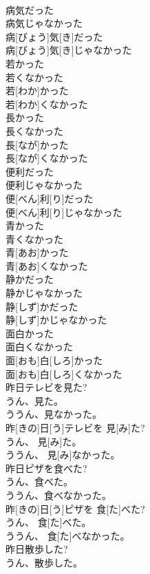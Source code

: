 \documentclass[8pt]{extreport}
\begin{document}
\begin{CJK}{UTF8}{min}
\\	病気だった 
\\	病気じゃなかった	
\\	病[びょう]気[き]だった 
\\	病[びょう]気[き]じゃなかった
\\	若かった 
\\	若くなかった	
\\	若[わか]かった 
\\	若[わか]くなかった
\\	長かった 
\\	長くなかった	
\\	長[なが]かった 
\\	長[なが]くなかった
\\	便利だった 
\\	便利じゃなかった	
\\	便[べん]利[り]だった 
\\	便[べん]利[り]じゃなかった
\\	青かった 
\\	青くなかった	
\\	青[あお]かった 
\\	青[あお]くなかった
\\	静かだった 
\\	静かじゃなかった	
\\	静[しず]かだった 
\\	静[しず]かじゃなかった
\\	面白かった 
\\	面白くなかった	
\\	面[おも]白[しろ]かった 
\\	面[おも]白[しろ]くなかった
\\	昨日テレビを見た? 
\\	うん、見た。 
\\	ううん、見なかった。	
\\	昨[きの]日[う]テレビを 見[み]た? 
\\	うん、 見[み]た。 
\\	ううん、 見[み]なかった。
\\	昨日ピザを食べた? 
\\	うん、食べた。 
\\	ううん、食べなかった。	
\\	昨[きの]日[う]ピザを 食[た]べた? 
\\	うん、 食[た]べた。 
\\	ううん、 食[た]べなかった。
\\	昨日散歩した? 
\\	うん、散歩した。 

\end{CJK}
\end{document}
